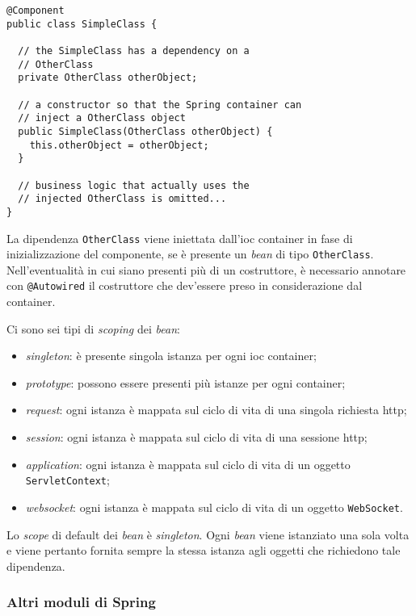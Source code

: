 \begin{tcolorbox}
	\begin{lstlisting}
@Component
public class SimpleClass {

  // the SimpleClass has a dependency on a
  // OtherClass
  private OtherClass otherObject;
	
  // a constructor so that the Spring container can
  // inject a OtherClass object
  public SimpleClass(OtherClass otherObject) {
    this.otherObject = otherObject;
  }

  // business logic that actually uses the
  // injected OtherClass is omitted...
}
	\end{lstlisting}
\end{tcolorbox}

La dipendenza \texttt{OtherClass} viene iniettata dall'\gls{ioc} container in fase di inizializzazione del componente, se è presente un \textit{bean} di tipo \texttt{OtherClass}.
Nell'eventualità in cui siano presenti più di un costruttore, è necessario annotare con \texttt{@Autowired} il costruttore che dev'essere preso in considerazione dal container.

Ci sono sei tipi di \textit{scoping} dei \textit{bean}:
\begin{itemize}
	\item \textit{singleton}: è presente singola istanza per ogni \gls{ioc} container;
	\item \textit{prototype}: possono essere presenti più istanze per ogni container;
	\item \textit{request}: ogni istanza è mappata sul ciclo di vita di una singola richiesta \acrshort{http};
	\item \textit{session}: ogni istanza è mappata sul ciclo di vita di una sessione \acrshort{http};
	\item \textit{application}: ogni istanza è mappata sul ciclo di vita di un oggetto \texttt{ServletContext};
	\item \textit{websocket}: ogni istanza è mappata sul ciclo di vita di un oggetto \texttt{WebSocket}.
\end{itemize}

Lo \textit{scope} di default dei \textit{bean} è \textit{singleton}. Ogni \textit{bean} viene istanziato una sola volta e viene pertanto fornita sempre la stessa istanza agli oggetti che richiedono tale dipendenza.

\subsubsection{Altri moduli di Spring}

